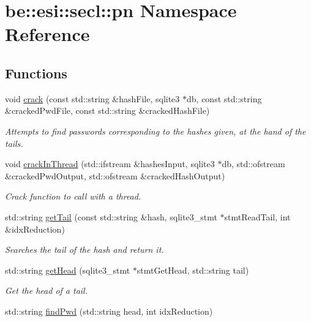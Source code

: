 \hypertarget{namespacebe_1_1esi_1_1secl_1_1pn}{}\section{be\+:\+:esi\+:\+:secl\+:\+:pn Namespace Reference}
\label{namespacebe_1_1esi_1_1secl_1_1pn}
\subsection*{Functions}
\begin{DoxyCompactItemize}
\item 
void \hyperlink{namespacebe_1_1esi_1_1secl_1_1pn_aad832fb30fa4cc9e74d15d7129d0c929}{crack} (const std\+::string \&hash\+File, sqlite3 $\ast$db, const std\+::string \&cracked\+Pwd\+File, const std\+::string \&cracked\+Hash\+File)
\begin{DoxyCompactList}\small\item\em Attempts to find passwords corresponding to the hashes given, at the hand of the tails. \end{DoxyCompactList}\item 
void \hyperlink{namespacebe_1_1esi_1_1secl_1_1pn_a5421a253f4c247695a0f26055ecc4dea}{crack\+In\+Thread} (std\+::ifstream \&hashes\+Input, sqlite3 $\ast$db, std\+::ofstream \&cracked\+Pwd\+Output, std\+::ofstream \&cracked\+Hash\+Output)
\begin{DoxyCompactList}\small\item\em Crack function to call with a thread. \end{DoxyCompactList}\item 
std\+::string \hyperlink{namespacebe_1_1esi_1_1secl_1_1pn_a44dea6059d3689561497f5f03e09dac2}{get\+Tail} (const std\+::string \&hash, sqlite3\+\_\+stmt $\ast$stmt\+Read\+Tail, int \&idx\+Reduction)
\begin{DoxyCompactList}\small\item\em Searches the tail of the hash and return it. \end{DoxyCompactList}\item 
std\+::string \hyperlink{namespacebe_1_1esi_1_1secl_1_1pn_a4f2bdcedf26f904e1e07776955d80d97}{get\+Head} (sqlite3\+\_\+stmt $\ast$stmt\+Get\+Head, std\+::string tail)
\begin{DoxyCompactList}\small\item\em Get the head of a tail. \end{DoxyCompactList}\item 
std\+::string \hyperlink{namespacebe_1_1esi_1_1secl_1_1pn_ae68f13fff76cabc930b60594c300a168}{find\+Pwd} (std\+::string head, int idx\+Reduction)

\end{DoxyCompactItemize}
